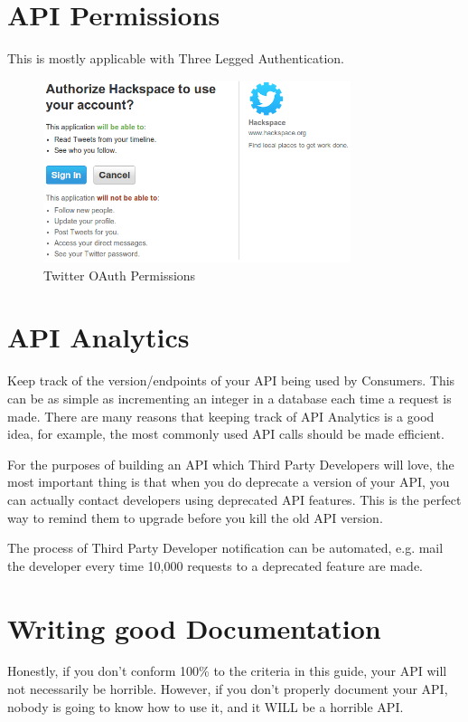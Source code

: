 \documentclass{book}
\begin{document}
\chapter{API Permissions}

This is mostly applicable with Three Legged Authentication.

\begin{figure}[ht!]
\centering
\includegraphics[width=90mm]{images/permissions-twitter.png}
\caption{Twitter OAuth Permissions}
\label{overflow}
\end{figure}


\chapter{API Analytics}

Keep track of the version/endpoints of your API being used by Consumers. This can be as simple as incrementing an integer in a database each time a request is made. There are many reasons that keeping track of API Analytics is a good idea, for example, the most commonly used API calls should be made efficient.

For the purposes of building an API which Third Party Developers will love, the most important thing is that when you do deprecate a version of your API, you can actually contact developers using deprecated API features. This is the perfect way to remind them to upgrade before you kill the old API version.

The process of Third Party Developer notification can be automated, e.g. mail the developer every time 10,000 requests to a deprecated feature are made.


\chapter{Writing good Documentation}

Honestly, if you don't conform 100\% to the criteria in this guide, your API will not necessarily be horrible. However, if you don't properly document your API, nobody is going to know how to use it, and it WILL be a horrible API.
\end{document}
